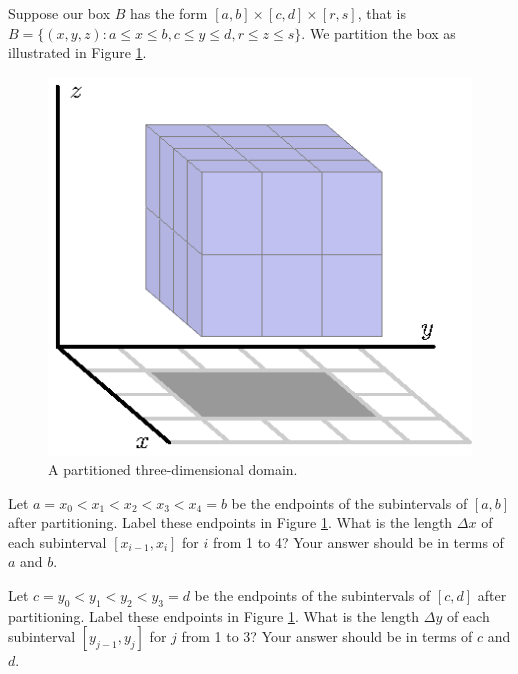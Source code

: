 \begin{activity} \label{A:11.7.1} Suppose our box $B$ has the form $[a,b] \times [c,d] \times [r,s]$, that is $B = \{(x,y,z) : a \leq x \leq b, c \leq y \leq d, r \leq z \leq s\}$. We partition the box as illustrated in Figure \ref{F:11.7.Box_domain_2}.

\begin{figure}[ht]
\begin{center}
  \includegraphics{figures/fig_11_7_partition.eps}
\end{center}
\caption{A partitioned three-dimensional domain.}
\label{F:11.7.Box_domain_2}
\end{figure}
	\ba
	\item Let $a=x_0 < x_1 < x_2 < x_3 < x_4=b$ be the endpoints of the subintervals of $[a,b]$ after partitioning. Label these endpoints in Figure \ref{F:11.7.Box_domain_2}. What is the length $\Delta x$ of each subinterval $[x_{i-1},x_i]$ for $i$ from 1 to 4? Your answer should be in terms of $a$ and $b$.
	
	
		
	\item Let $c=y_0 < y_1 < y_2 < y_3=d$ be the endpoints of the subintervals of $[c,d]$ after partitioning. Label these endpoints in Figure \ref{F:11.7.Box_domain_2}. What is the length $\Delta y$ of each subinterval $[y_{j-1},y_j]$ for $j$ from 1 to 3? Your answer should be in terms of $c$ and $d$.
	

\end{activity}

